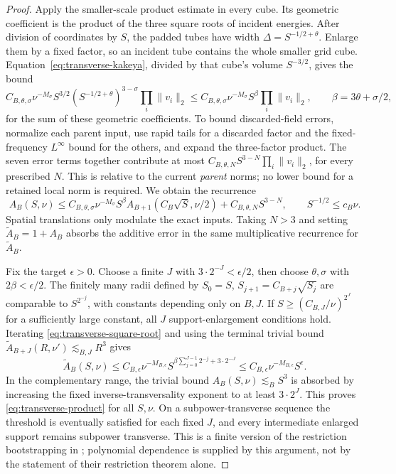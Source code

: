 \begin{proof}
Apply the smaller-scale product estimate in every cube.  Its geometric
coefficient is the product of the three square roots of incident
energies.  After division of coordinates by $S$, the padded tubes
have width $\Delta=S^{-1/2+\theta}$.  Enlarge them by a fixed factor,
so an incident tube contains the whole smaller grid cube.
Equation~\eqref{eq:transverse-kakeya}, divided by that cube's volume
$S^{-3/2}$, gives the bound
\[
 C_{B,\theta,\sigma}\nu^{-M_\sigma}
 S^{3/2}(S^{-1/2+\theta})^{3-\sigma}
 \prod_i\|v_i\|_2
 \le C_{B,\theta,\sigma}\nu^{-M_\sigma}
 S^\beta\prod_i\|v_i\|_2,\qquad
 \beta=3\theta+\sigma/2,
\]
for the sum of these geometric coefficients.
To bound discarded-field errors, normalize each parent input, use
rapid tails for a discarded factor and the fixed-frequency
$L^\infty$ bound for the others, and expand the three-factor product.
The seven error terms together contribute at most
$C_{B,\theta,N}S^{3-N}\prod_i\|v_i\|_2$, for every prescribed $N$.
This is relative to the current \emph{parent} norms; no lower bound
for a retained local norm is required.  We obtain the recurrence
\begin{equation}\label{eq:transverse-square-root}
 A_B(S,\nu)\le C_{B,\theta,\sigma}\nu^{-M_\sigma}S^\beta
       A_{B+1}(C_B\sqrt S,\nu/2)
       +C_{B,\theta,N}S^{3-N},
 \qquad S^{-1/2}\le c_B\nu.
\end{equation}
Spatial translations only modulate the exact inputs.  Taking $N>3$
and setting $\widetilde A_B=1+A_B$ absorbs the additive error in
the same multiplicative recurrence for $\widetilde A_B$.

Fix the target $\epsilon>0$.  Choose a finite $J$ with
$3\cdot2^{-J}<\epsilon/2$, then choose $\theta,\sigma$ with
$2\beta<\epsilon/2$.  The finitely many radii defined by
$S_0=S$, $S_{j+1}=C_{B+j}\sqrt{S_j}$ are comparable to
$S^{2^{-j}}$, with constants depending only on $B,J$.
If $S\ge(C_{B,J}/\nu)^{2^J}$ for a sufficiently large constant,
all $J$ support-enlargement conditions hold.  Iterating
\eqref{eq:transverse-square-root} and using the terminal trivial
bound $\widetilde A_{B+J}(R,\nu')\lesssim_{B,J}R^3$ gives
\[
 \widetilde A_B(S,\nu)
 \le C_{B,\epsilon}\nu^{-M_{B,\epsilon}}
 S^{\beta\sum_{j=0}^{J-1}2^{-j}+3\cdot2^{-J}}
 \le C_{B,\epsilon}\nu^{-M_{B,\epsilon}}S^\epsilon.
\]
In the complementary range, the trivial bound $A_B(S,\nu)\lesssim_B
S^3$ is absorbed by increasing the fixed inverse-transversality
exponent to at least $3\cdot2^J$.  This proves
\eqref{eq:transverse-product} for all $S,\nu$.  On a subpower-transverse
sequence the threshold is eventually satisfied for each fixed $J$,
and every intermediate enlarged support remains subpower transverse.
This is a finite version of the restriction bootstrapping in
\cite[Proposition~2.1]{BCT06}; polynomial dependence is supplied by this argument,
not by the statement of their restriction theorem alone.


\end{proof}
